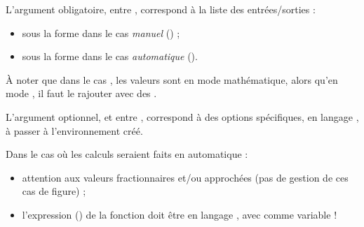 \begin{cautionblock}
L'argument obligatoire, entre , correspond à la liste des entrées/sorties :

\begin{itemize}
	\item sous la forme  dans le cas \textit{manuel} () ;
	\item sous la forme  dans le cas \textit{automatique} ().
\end{itemize}

\smallskip

À noter que dans le cas , les valeurs sont en mode mathématique, alors qu'en mode , il faut le rajouter avec des .

\smallskip

L'argument optionnel, et entre , correspond à des options spécifiques, en langage \TikZ, à passer à l'environnement créé.
\end{cautionblock}

\begin{importantblock}
Dans le cas où les calculs seraient faits en automatique :

\begin{itemize}
	\item attention aux valeurs fractionnaires et/ou approchées (pas de gestion de ces cas de figure) ;
	\item l'expression () de la fonction doit être en langage , avec  comme variable !
\end{itemize}
\end{importantblock}

\begin{PresCodeTexPL}{}
\end{PresCodeTexPL}

\begin{PresCodeTexPL}{}
\end{PresCodeTexPL}

\begin{PresCodeTexPL}{}
\end{PresCodeTexPL}

\begin{PresCodeTexPL}{}
\end{PresCodeTexPL}

\begin{PresCodeTexPL}{}
\end{PresCodeTexPL}